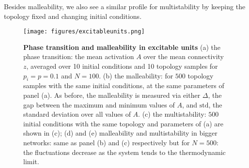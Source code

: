 \documentclass[reprint,onecolumn,superscriptaddress,showpacs,amsmath,amssymb,aps,prx,floatfix,]{revtex4-2}
\begin{document}
Besides malleability, we also see a similar profile for multistability by keeping the topology fixed and changing initial conditions.


\begin{figure}
    \centering
    \texttt{[image: figures/excitableunits.png]}
    \caption{\textbf{Phase transition and malleability in excitable units}
    (a) the phase transition: the mean activation $A$ over the mean connectivity $z$, averaged over 10 initial conditions and 10 topology samples for $p_i = p = 0.1$ and $N = 100$.  (b) the malleability: for $500$ topology samples with the same initial conditions, at the same parameters of panel (a). As before, the malleability is measured via either $\Delta$, the gap between the maximum and minimum values of $A$, and $\mathrm{std}$, the standard deviation over all values of $A$. (c) the multistability: $500$ initial conditions with the same topology and parameters of (a) are shown in (c); (d) and (e) malleability and multistability in bigger networks: same as panel (b) and (c) respectively but for $N = 500$: the fluctuations decrease as the system tends to the thermodynamic limit. 
    }
    \label{fig:excitableunits}
\end{figure}

%
\end{document}
